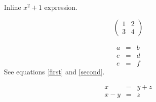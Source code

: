 Inline \begin{math}x^2+1\end{math} expression.

\begin{displaymath}
\begin{pmatrix}1 & 2 \\ 3 & 4\end{pmatrix}
\end{displaymath}

\begin{eqnarray}
a & = & b \label{first} \\
c & = & d \nonumber \\
e & = & f\label{second}
\end{eqnarray}
See equations \eqref{first} and \eqref{second}.

\begin{eqnarray*}
x & = & y + z \\
x - y & = & z
\end{eqnarray*}
